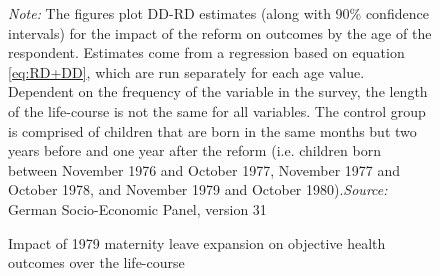\documentclass[a4paper ]{article}
\begin{document}
\begin{figure}[p]
\caption{Impact of 1979 maternity leave expansion on objective health outcomes over the life-course}\label{fig: LC_OH}
\begin{minipage}{\textwidth} %
{\footnotesize \textit{Note:} The figures plot DD-RD estimates (along with 90\% confidence intervals) for the impact of the reform on outcomes by the age of the respondent. Estimates come from a regression based on equation \ref{eq:RD+DD}, which are run separately for each age value. Dependent on the frequency of the variable in the survey, the length of the life-course is not the same for all variables. The control group is comprised of children that are born in the same months but two years before and one year after the reform (i.e. children born between November 1976 and October 1977, November 1977 and October 1978, and November 1979 and October 1980).\newline \textit{Source: }German Socio-Economic Panel, version 31\par}
\end{minipage}
\end{figure}
\newpage
\end{document}
